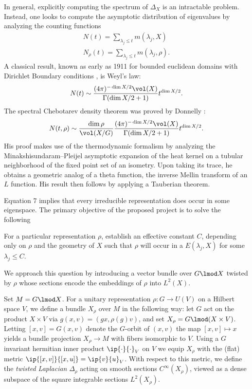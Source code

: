 \documentclass[11pt]{article}
\begin{document}
 In general, explicitly computing the spectrum of $\Delta_X$ is an intractable problem. Instead, one looks to compute the asymptotic distribution of eigenvalues by analyzing the counting functions 
 \begin{align}
   N(t)=\sum_{\lambda_j\leq t} m(\lambda_j,X)\\
   N_\rho(t)=\sum_{\lambda_j\leq t} m(\lambda_j,\rho).
   \end{align}
A classical result, known as early as 1911 for bounded euclidean domains with Dirichlet Boundary conditions \cite{weyl1911}, is Weyl's law: 
\begin{align}
N(t)\sim \frac{(4\pi)^{-\dim X/2}\vol(X)}{\Gamma(\dim X/2+1)} t^{\dim X/2}.
\end{align}
The spectral Chebotarev density theorem was proved by Donnelly \cite{Donnelly1978}:  
\begin{align}
 N(t,\rho)\sim \frac{\dim \rho}{\vol(X/G)}\frac{(4\pi)^{-\dim X/2}\vol(X)}{\Gamma(\dim X/2+1)} t^{\dim X/2} \label{eq:1}.
\end{align}
His proof makes use of the thermodynamic formalism by analyzing the Minakshisundaram--Pleijel \cite{MP1949} asymptotic expansion of the heat kernel on a tubular neighborhood of the fixed point set of an isometry. Upon taking its trace, he obtains a geometric analog of a theta function, the inverse Mellin transform of an $L$ function. His result then follows by applying a Tauberian theorem.

Equation 7 implies that every irreducible representation does occur in some eigenspace. The primary objective of the proposed project is to solve the following 
\begin{problem}
  For a particular representation $\rho$, establish an effective constant $C$, depending only on $\rho$ and the geometry of $X$ such that $\rho$ will occur in a $E(\lambda_j,X)$ for some $\lambda_j\leq C$. 
\end{problem} We approach this question by introducing a vector bundle over $G\lmod X$ twisted by $\rho$ whose sections encode the embeddings of $\rho$ into $L^2(X)$. 

Set $M=G\lmod X$. For a unitary representation $\rho:G\to U(V)$ on a Hilbert space $V$, we define a bundle $X_\rho$ over $M$ in the following way: let $G$ act on the product $X\times V$ via $g(x,v)=(gx,\rho(g)v)$, and set $X_\rho=G\lmod (X\times V)$. Letting $[x,v]=G(x,v)$ denote the $G$-orbit of $(x,v)$ the map $[x,v]\mapsto x$ yields a bundle projection $X_\rho \to M$ with fibers isomorphic to $V$. Using a $G$ invariant hermitian inner product $\ip{\cdot}{\cdot}_V$ on $V$ we equip $X_\rho$ with the (flat) metric $\ip{[x,v]}{[x,u]}=\ip{v}{u}_V$. With respect to this metric, we define the \emph{twisted Laplacian} $\Delta_\rho$ acting on smooth sections $C^\infty(X_\rho)$, viewed as a dense subspace of the square integrable sections $L^2(X_\rho)$.
\end{document}
